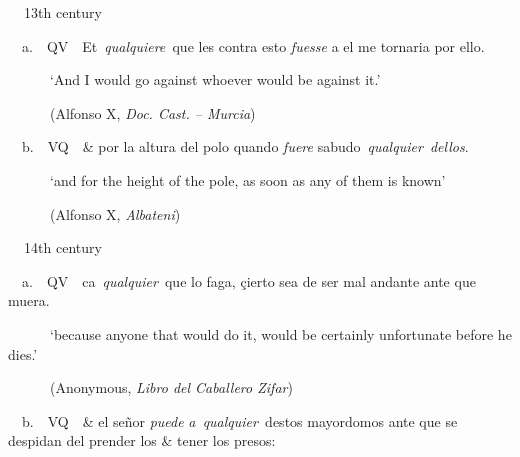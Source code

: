 \begin{styleStandard}
\textbf{\ \ }13th century
\end{styleStandard}

\begin{styleStandard}
\ \ a.\ \ QV\ \ Et~\textit{qualquiere~}que les contra esto \textit{fuesse} a el me tornaria por ello. 
\end{styleStandard}

\begin{styleStandard}
\ \ \ \ \ \ ‘And I would go against whoever would be against it.’
\end{styleStandard}

\begin{styleStandard}
\ \ \ \ \ \ (Alfonso X, \textit{Doc. Cast. – Murcia})
\end{styleStandard}

\begin{styleStandard}
\ \ b.\ \ VQ\ \ \& por la altura del polo quando \textit{fuere} sabudo~\textit{qualquier~dellos}. 
\end{styleStandard}

\begin{styleStandard}
\ \ \ \ \ \ ‘and for the height of the pole, as soon as any of them is known’
\end{styleStandard}

\begin{styleStandard}
\ \ \ \ \ \ (Alfonso X, \textit{Albateni})
\end{styleStandard}

\begin{styleStandard}
\textbf{\ \ }14th century
\end{styleStandard}

\begin{styleStandard}
\ \ a.\ \ QV\ \ ca~\textit{qualquier~}que lo faga, çierto sea de ser mal andante ante que muera. 
\end{styleStandard}

\begin{styleStandard}
\ \ \ \ \ \ ‘because anyone that would do it, would be certainly unfortunate before he dies.’
\end{styleStandard}

\begin{styleStandard}
\ \ \ \ \ \ (Anonymous, \textit{Libro del Caballero Zifar})
\end{styleStandard}

\begin{styleStandard}
\ \ b.\ \ VQ\ \ \& el señor \textit{puede} \textit{a~qualquier~}destos mayordomos ante que se despidan del prender los \& tener los presos: 
\end{styleStandard}


